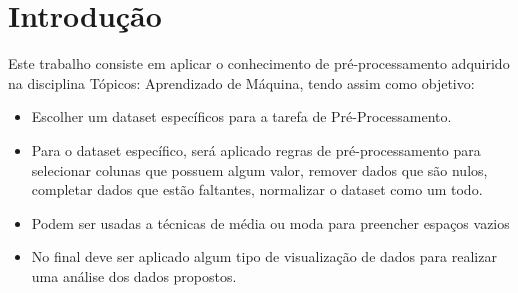 \chapter{Introdução}\label{cap_intro}

Este trabalho consiste em aplicar o conhecimento de pré-processamento adquirido na disciplina Tópicos: Aprendizado de Máquina, tendo assim como objetivo:

\begin{itemize}
	\item Escolher um dataset específicos para a tarefa de Pré-Processamento.
	
	\item Para o dataset específico, será aplicado regras de pré-processamento para selecionar colunas que possuem algum valor, remover dados que são nulos, completar dados que estão faltantes, normalizar o dataset como um todo.
	
	\item Podem ser usadas a técnicas de média ou moda para preencher espaços vazios
	
	\item No final deve ser aplicado algum tipo de visualização de dados para realizar uma análise dos dados propostos.
\end{itemize}
